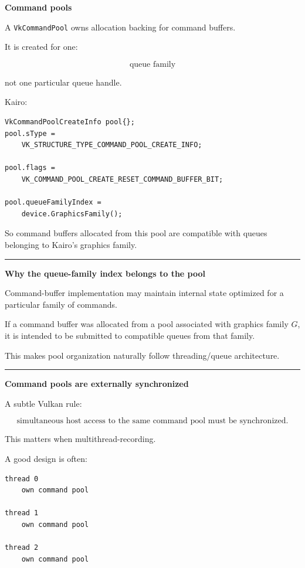 \textbf{Command pools}

A \texttt{VkCommandPool} owns allocation backing for command buffers.

It is created for one:

\[
\boxed{\text{queue family}}
\]

not one particular queue handle.

Kairo:

\begin{verbatim}
VkCommandPoolCreateInfo pool{};
pool.sType =
    VK_STRUCTURE_TYPE_COMMAND_POOL_CREATE_INFO;

pool.flags =
    VK_COMMAND_POOL_CREATE_RESET_COMMAND_BUFFER_BIT;

pool.queueFamilyIndex =
    device.GraphicsFamily();
\end{verbatim}

So command buffers allocated from this pool are compatible with queues belonging to Kairo's graphics family.

\begin{center}\rule{0.5\linewidth}{0.5pt}\end{center}

\textbf{Why the queue-family index belongs to the pool}

Command-buffer implementation may maintain internal state optimized for a particular family of commands.

If a command buffer was allocated from a pool associated with graphics family \(G\), it is intended to be submitted to compatible queues from that family.

This makes pool organization naturally follow threading/queue architecture.

\begin{center}\rule{0.5\linewidth}{0.5pt}\end{center}

\textbf{Command pools are externally synchronized}

A subtle Vulkan rule:

\[
\boxed{
\text{simultaneous host access to the same command pool must be synchronized}.
}
\]

This matters when multithread-recording.

A good design is often:

\begin{verbatim}
thread 0
    own command pool

thread 1
    own command pool

thread 2
    own command pool
\end{verbatim}

